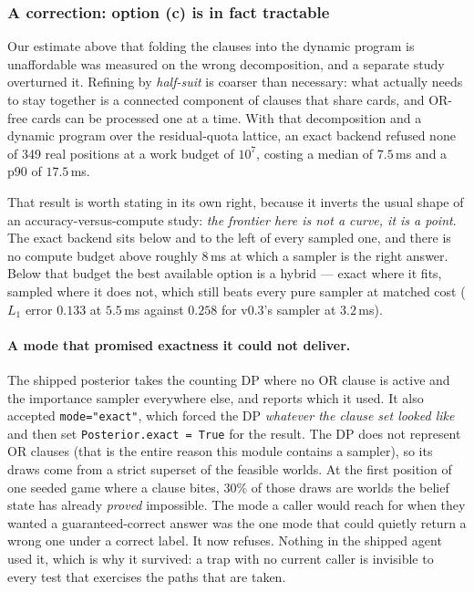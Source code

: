 \documentclass[11pt,letterpaper]{article}
\begin{document}
\subsubsection{A correction: option (c) is in fact tractable}
\label{sec:clauses-correction}

Our estimate above that folding the clauses into the dynamic program is
unaffordable was measured on the wrong decomposition, and a separate study
overturned it. Refining by \emph{half-suit} is coarser than necessary: what
actually needs to stay together is a connected component of clauses that share
cards, and OR-free cards can be processed one at a time. With that
decomposition and a dynamic program over the residual-quota lattice, an exact
backend refused none of 349 real positions at a work budget of $10^7$, costing
a median of $7.5$\,ms and a p90 of $17.5$\,ms.

That result is worth stating in its own right, because it inverts the usual
shape of an accuracy-versus-compute study: \emph{the frontier here is not a
curve, it is a point}. The exact backend sits below and to the left of every
sampled one, and there is no compute budget above roughly $8$\,ms at which a
sampler is the right answer. Below that budget the best available option is a
hybrid --- exact where it fits, sampled where it does not, which still beats
every pure sampler at matched cost ($L_1$ error $0.133$ at $5.5$\,ms against
$0.258$ for v0.3's sampler at $3.2$\,ms).

\paragraph{A mode that promised exactness it could not deliver.} The shipped
posterior takes the counting DP where no OR clause is active and the importance
sampler everywhere else, and reports which it used. It also accepted
\texttt{mode="exact"}, which forced the DP \emph{whatever the clause set looked
like} and then set \texttt{Posterior.exact = True} for the result. The DP does
not represent OR clauses (that is the entire reason this module contains a
sampler), so its draws come from a strict superset of the feasible worlds. At
the first position of one seeded game where a clause bites, $30\%$ of those
draws are worlds the belief state has already \emph{proved} impossible. The
mode a caller would reach for when they wanted a guaranteed-correct answer was
the one mode that could quietly return a wrong one under a correct label. It
now refuses. Nothing in the shipped agent used it, which is why it survived:
a trap with no current caller is invisible to every test that exercises the
paths that are taken.
\end{document}
